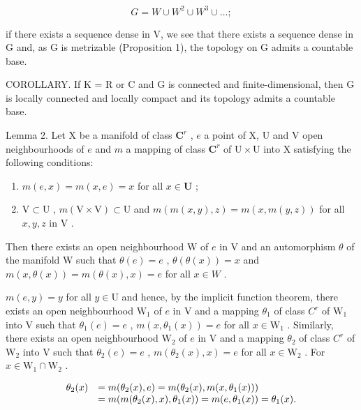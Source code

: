 \[
G = W \cup W ^ {2} \cup W ^ {3} \cup \dots ;
\]

if there exists a sequence dense in V, we see that there exists a sequence dense in G and, as G is metrizable (Proposition 1), the topology on G admits a countable base.

COROLLARY. If K = R or C and G is connected and finite-dimensional, then G is locally connected and locally compact and its topology admits a countable base.

Lemma 2. Let X be a manifold of class \(\mathbf{C}^r\) , \(e\) a point of X, U and V open neighbourhoods of \(e\) and \(m\) a mapping of class \(\mathbf{C}^r\) of \(\mathrm{U} \times \mathrm{U}\) into X satisfying the following conditions:

\begin{enumerate}
\def\labelenumi{(\alph{enumi})}
\item
  \(m(e,x) = m(x,e) = x\) for all \(x\in \mathbf{U}\) ;
\item
  \(\mathrm{V} \subset \mathrm{U}\) , \(m(\mathrm{V} \times \mathrm{V}) \subset \mathrm{U}\) and \(m(m(x, y), z) = m(x, m(y, z))\) for all \(x, y, z\) in \(\mathrm{V}\) .
\end{enumerate}

Then there exists an open neighbourhood W of \(e\) in V and an automorphism \(\theta\) of the manifold W such that \(\theta(e) = e\) , \(\theta(\theta(x)) = x\) and \(m(x, \theta(x)) = m(\theta(x), x) = e\) for all \(x \in W\) .

\(m(e,y) = y\) for all \(y \in \mathrm{U}\) and hence, by the implicit function theorem, there exists an open neighbourhood \(\mathrm{W}_1\) of \(e\) in \(\mathrm{V}\) and a mapping \(\theta_1\) of class \(C^r\) of \(\mathrm{W}_1\) into \(\mathrm{V}\) such that \(\theta_1(e) = e\) , \(m(x,\theta_1(x)) = e\) for all \(x \in \mathrm{W}_1\) . Similarly, there exists an open neighbourhood \(\mathrm{W}_2\) of \(e\) in \(\mathrm{V}\) and a mapping \(\theta_2\) of class \(C^r\) of \(\mathrm{W}_2\) into \(\mathrm{V}\) such that \(\theta_2(e) = e\) , \(m(\theta_2(x),x) = e\) for all \(x \in \mathrm{W}_2\) . For \(x \in \mathrm{W}_1 \cap \mathrm{W}_2\) .

\[
\begin{array}{r l} \theta_ {2} (x) & = m (\theta_ {2} (x), e) = m (\theta_ {2} (x), m (x, \theta_ {1} (x))) \\ & = m (m (\theta_ {2} (x), x), \theta_ {1} (x)) = m (e, \theta_ {1} (x)) = \theta_ {1} (x). \end{array}
\]

